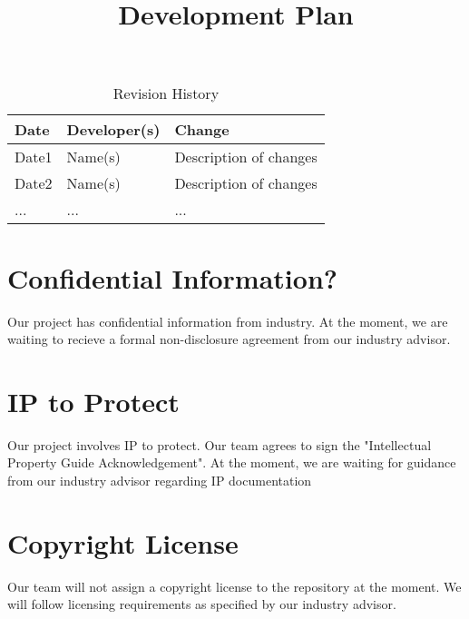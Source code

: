 \documentclass{article}
\title{Development Plan\\\progname}
\author{\authname}
\date{}
\begin{document}
\maketitle

\begin{table}[hp]
\caption{Revision History} \label{TblRevisionHistory}
\begin{tabularx}{\textwidth}{llX}
\toprule
\textbf{Date} & \textbf{Developer(s)} & \textbf{Change}\\
\midrule
Date1 & Name(s) & Description of changes\\
Date2 & Name(s) & Description of changes\\
... & ... & ...\\
\bottomrule
\end{tabularx}
\end{table}

\newpage{}



\section{Confidential Information?}

Our project has confidential information from industry. At the moment, we are waiting to recieve a formal non-disclosure agreement from our industry advisor.

\section{IP to Protect}

Our project involves IP to protect. Our team agrees to sign the "Intellectual Property Guide Acknowledgement". At the moment, we are waiting for guidance from our industry advisor regarding IP documentation

\section{Copyright License}

Our team will not assign a copyright license to the repository at the moment. We will follow licensing requirements as specified by our industry advisor.
\end{document}
